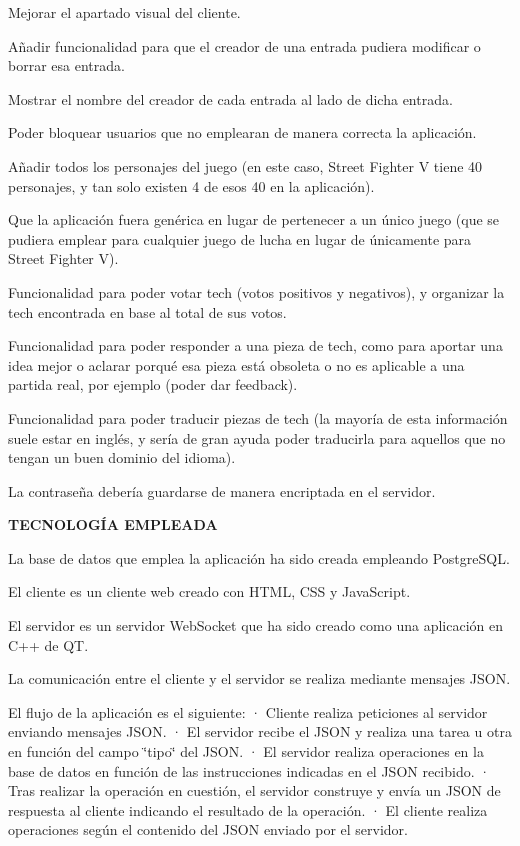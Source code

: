 \begin{DoxyItemize}
\item Mejorar el apartado visual del cliente.
\item Añadir funcionalidad para que el creador de una entrada pudiera modificar o borrar esa entrada.
\item Mostrar el nombre del creador de cada entrada al lado de dicha entrada.
\item Poder bloquear usuarios que no emplearan de manera correcta la aplicación.
\item Añadir todos los personajes del juego (en este caso, Street Fighter V tiene 40 personajes, y tan solo existen 4 de esos 40 en la aplicación).
\item Que la aplicación fuera genérica en lugar de pertenecer a un único juego (que se pudiera emplear para cualquier juego de lucha en lugar de únicamente para Street Fighter V).
\item Funcionalidad para poder votar tech (votos positivos y negativos), y organizar la tech encontrada en base al total de sus votos.
\item Funcionalidad para poder responder a una pieza de tech, como para aportar una idea mejor o aclarar porqué esa pieza está obsoleta o no es aplicable a una partida real, por ejemplo (poder dar feedback).
\item Funcionalidad para poder traducir piezas de tech (la mayoría de esta información suele estar en inglés, y sería de gran ayuda poder traducirla para aquellos que no tengan un buen dominio del idioma).
\item La contraseña debería guardarse de manera encriptada en el servidor.
\end{DoxyItemize}

{\bfseries T\+E\+C\+N\+O\+L\+O\+GÍA E\+M\+P\+L\+E\+A\+DA}


\begin{DoxyItemize}
\item La base de datos que emplea la aplicación ha sido creada empleando Postgre\+S\+QL.
\item El cliente es un cliente web creado con H\+T\+ML, C\+SS y Java\+Script.
\item El servidor es un servidor Web\+Socket que ha sido creado como una aplicación en C++ de QT.
\item La comunicación entre el cliente y el servidor se realiza mediante mensajes J\+S\+ON.
\item El flujo de la aplicación es el siguiente\+: · Cliente realiza peticiones al servidor enviando mensajes J\+S\+ON. · El servidor recibe el J\+S\+ON y realiza una tarea u otra en función del campo \char`\"{}tipo\char`\"{} del J\+S\+ON. · El servidor realiza operaciones en la base de datos en función de las instrucciones indicadas en el J\+S\+ON recibido. · Tras realizar la operación en cuestión, el servidor construye y envía un J\+S\+ON de respuesta al cliente indicando el resultado de la operación. · El cliente realiza operaciones según el contenido del J\+S\+ON enviado por el servidor.
\end{DoxyItemize}

